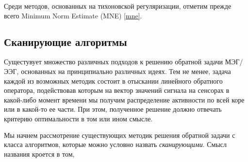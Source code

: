 Среди методов, основанных на тихоновской регуляризации, отметим прежде всего
Minimum Norm Estimate (MNE) \ref{mne}.


\subsection{Сканирующие алгоритмы} \label{sect_dics}

Сущестувует множество различных подходов к решению обратной задачи МЭГ/ЭЭГ,
основанных на принципиально различных идеях.  Тем не менее, задача каждой из
возможных методик состоит в отыскании линейного обратного оператора,
подействовав которым на вектор значений сигнала на сенсорах в какой-либо момент
времени мы получим распределение активности по всей коре или в какой-то ее
части.  При этом, полученное решение должно отвечать критерию оптимальности в
том или ином смысле.

Мы начнем рассмотрение существующих методик решения обратной задачи с класса алгоритмов, которые
можно условно назвать \emph{сканирующими}. Смысл названия кроется в том,
